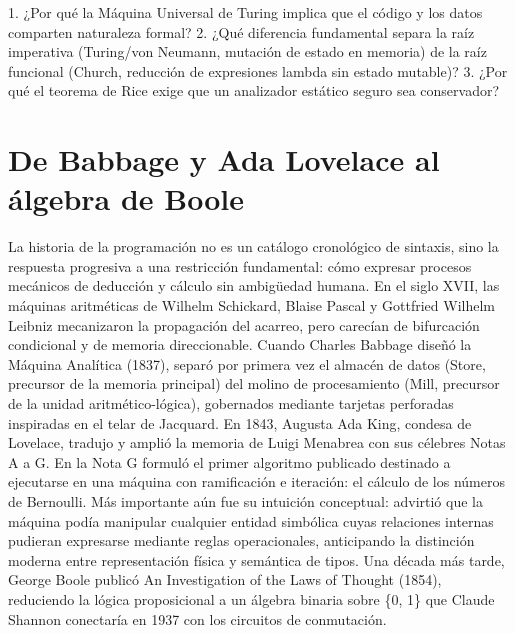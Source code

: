 \documentclass{book}
\begin{document}
\begin{tcolorbox}[title={Autoficha}, studiumcheck, breakable]

1. ¿Por qué la Máquina Universal de Turing implica que el código y los datos comparten naturaleza formal? 2. ¿Qué diferencia fundamental separa la raíz imperativa (Turing/von Neumann, mutación de estado en memoria) de la raíz funcional (Church, reducción de expresiones lambda sin estado mutable)? 3. ¿Por qué el teorema de Rice exige que un analizador estático seguro sea conservador?
\end{tcolorbox}

\section{De Babbage y Ada Lovelace al álgebra de Boole}

La historia de la programación no es un catálogo cronológico de sintaxis, sino la respuesta progresiva a una restricción fundamental: cómo expresar procesos mecánicos de deducción y cálculo sin ambigüedad humana. En el siglo XVII, las máquinas aritméticas de Wilhelm Schickard, Blaise Pascal y Gottfried Wilhelm Leibniz mecanizaron la propagación del acarreo, pero carecían de bifurcación condicional y de memoria direccionable. Cuando Charles Babbage diseñó la Máquina Analítica (1837), separó por primera vez el almacén de datos (Store, precursor de la memoria principal) del molino de procesamiento (Mill, precursor de la unidad aritmético-lógica), gobernados mediante tarjetas perforadas inspiradas en el telar de Jacquard.
En 1843, Augusta Ada King, condesa de Lovelace, tradujo y amplió la memoria de Luigi Menabrea con sus célebres Notas A a G. En la Nota G formuló el primer algoritmo publicado destinado a ejecutarse en una máquina con ramificación e iteración: el cálculo de los números de Bernoulli. Más importante aún fue su intuición conceptual: advirtió que la máquina podía manipular cualquier entidad simbólica cuyas relaciones internas pudieran expresarse mediante reglas operacionales, anticipando la distinción moderna entre representación física y semántica de tipos. Una década más tarde, George Boole publicó An Investigation of the Laws of Thought (1854), reduciendo la lógica proposicional a un álgebra binaria sobre \{0, 1\} que Claude Shannon conectaría en 1937 con los circuitos de conmutación.
\end{document}
